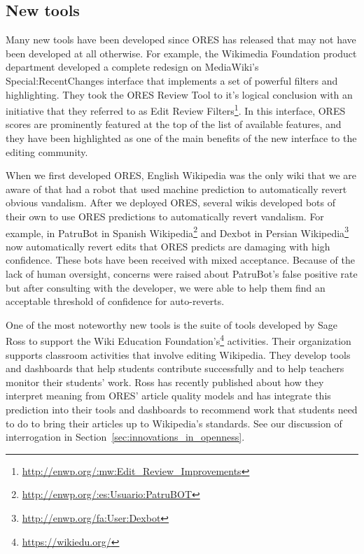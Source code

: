 \subsection{New tools}

Many new tools have been developed since ORES has released that may not have been developed at all otherwise.  For example, the Wikimedia Foundation product department developed a complete redesign on MediaWiki's Special:RecentChanges interface that implements a set of powerful filters and highlighting.  They took the ORES Review Tool to it's logical conclusion with an initiative that they referred to as Edit Review Filters\footnote{\url{http://enwp.org/:mw:Edit_Review_Improvements}}.  In this interface, ORES scores are prominently featured at the top of the list of available features, and they have been highlighted as one of the main benefits of the new interface to the editing community.

When we first developed ORES, English Wikipedia was the only wiki that we are aware of that had a robot that used machine prediction to automatically revert obvious vandalism\cite{carter2008cluebot}.  After we deployed ORES, several wikis developed bots of their own to use ORES predictions to automatically revert vandalism.  For example, in PatruBot in Spanish Wikipedia\footnote{\url{http://enwp.org/:es:Usuario:PatruBOT}} and Dexbot in Persian Wikipedia\footnote{\url{http://enwp.org/fa:User:Dexbot}} now automatically revert edits that ORES predicts are damaging with high confidence.  These bots have been received with mixed acceptance.  Because of the lack of human oversight, concerns were raised about PatruBot's false positive rate but after consulting with the developer, we were able to help them find an acceptable threshold of confidence for auto-reverts.

One of the most noteworthy new tools is the suite of tools developed by Sage Ross to support the Wiki Education Foundation's\footnote{\url{https://wikiedu.org/}} activities.  Their organization supports classroom activities that involve editing Wikipedia.  They develop tools and dashboards that help students contribute successfully and to help teachers monitor their students' work.  Ross has recently published about how they interpret meaning from ORES' article quality models\cite{ross2016visualizing} and has integrate this prediction into their tools and dashboards to recommend work that students need to do to bring their articles up to Wikipedia's standards.  See our discussion of interrogation in Section~\ref{sec:innovations_in_openness}.
